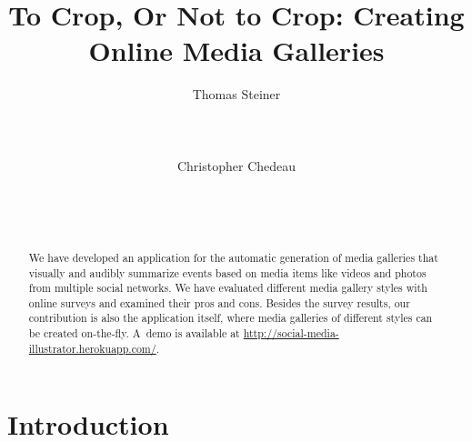 \documentclass{sig-alternate}
\newcommand{\inlinelistingsize}{\fontsize{8pt}{11pt}}
\let\oldurl\url
\renewcommand{\url}[1]{\inlinelistingsize\oldurl{#1}}
\begin{document}


\title{To Crop, Or Not to Crop: Creating Online Media Galleries}

\author{
\alignauthor
Thomas Steiner\\
	\\
	\\
	\\
\alignauthor
Christopher Chedeau\\
	\\
	\\
	\\
}
\maketitle

\begin{abstract}
We have developed an application for the automatic generation of
media galleries that visually and audibly summarize events
based on media items like videos and photos from multiple social networks.
We have evaluated different media gallery styles with online surveys 
and examined their pros and cons.
Besides the survey results, our contribution is also the application itself,
where media galleries of different styles can be created on-the-fly.
A~demo is available at
\url{http://social-media-illustrator.herokuapp.com/}.
\end{abstract}

\vspace{-1mm}

\vspace{-2mm}

\vspace{-2mm}

\section{Introduction}
\label{sec:introduction}
\end{document}

